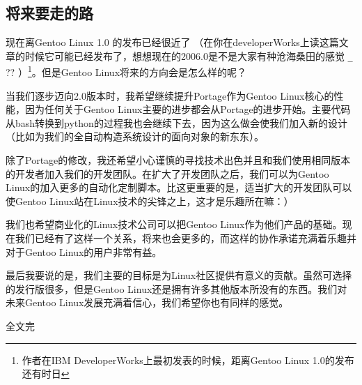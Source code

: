 \subsection{将来要走的路}

现在离Gentoo Linux 1.0 的发布已经很近了
（在你在developerWorks上读这篇文章的时候它可能已经发布了，想想现在的2006.0是不是大家有种沧海桑田的感觉
\verb ^_^ ??
）\footnote{作者在IBM DeveloperWorks上最初发表的时候，距离Gentoo Linux 1.0的发布还有时日}。但是Gentoo Linux将来的方向会是怎么样的呢？

当我们逐步迈向2.0版本时，我希望继续提升Portage作为Gentoo Linux核心的性能，因为任何关于Gentoo Linux主要的进步都会从Portage的进步开始。主要代码从bash转换到python的过程我也会继续下去，因为这么做会使我们加入新的设计（比如为我们的全自动构造系统设计的面向对象的新东东）。

除了Portage的修改，我还希望小心谨慎的寻找技术出色并且和我们使用相同版本的开发者加入我们的开发团队。在扩大了开发团队之后，我们可以为Gentoo Linux的加入更多的自动化定制脚本。比这更重要的是，适当扩大的开发团队可以使Gentoo Linux站在Linux技术的尖锋之上，这才是乐趣所在嘛：）

我们也希望商业化的Linux技术公司可以把Gentoo Linux作为他们产品的基础。现在我们已经有了这样一个关系，将来也会更多的，而这样的协作承诺充满着乐趣并对于Gentoo Linux的用户非常有益。

最后我要说的是，我们主要的目标是为Linux社区提供有意义的贡献。虽然可选择的发行版很多，但是Gentoo Linux还是拥有许多其他版本所没有的东西。我们对未来Gentoo Linux发展充满着信心，我们希望你也有同样的感觉。
\vfill
\begin{center}
{\Huge 全文完}
\end{center}
\vfill